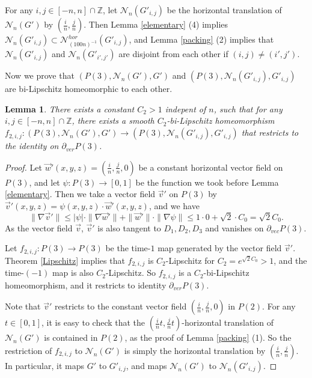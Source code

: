 \documentclass{amsart}
\newtheorem{lem}[thm]{Lemma}
\begin{document}
For any $i,j\in [-n,n]\cap \mathbb{Z}$, let $\mathcal{N}_n(G'_{i,j})$ be the horizontal translation of $\mathcal{N}_n(G')$ by $(\frac{i}{n},\frac{j}{n})$. Then Lemma \ref{elementary} (4) implies $\mathcal{N}_n(G'_{i,j})\subset \mathcal{N}^{hor}_{(100n)^{-1}}(G'_{i,j})$, and Lemma \ref{packing} (2) implies that $\mathcal{N}_n(G'_{i,j})$ and $\mathcal{N}_n(G'_{i',j'})$ are disjoint from each other if $(i,j)\ne (i',j')$.

Now we prove that $(P(3),\mathcal{N}_n(G'),G')$ and $(P(3),\mathcal{N}_n(G'_{i,j}),G'_{i,j})$ are bi-Lipschitz homeomorphic to each other.

\begin{lem}\label{translation}
There exists a constant $C_2>1$ indepent of $n$, such that for any $i,j\in [-n,n]\cap \mathbb{Z}$, there exists a smooth $C_2$-bi-Lipschitz homeomorphism $f_{2,i,j}:(P(3),\mathcal{N}_n(G'),G')\to (P(3),\mathcal{N}_n(G'_{i,j}),G'_{i,j})$ that restricts to the identity on $\partial_{ver}P(3)$.
\end{lem} 

\begin{proof}
Let $\vec{w}'(x,y,z)=(\frac{i}{n},\frac{j}{n}, 0)$ be a constant horizontal vector field on $P(3)$, and let $\psi:P(3)\to [0,1]$ be the function we took before Lemma \ref{elementary}. Then we take a vector field $\vec{v}'$ on $P(3)$ by $\vec{v}'(x,y,z)=\psi(x,y,z)\cdot \vec{w}'(x,y,z)$, and we have 
$$\|\nabla \vec{v}'\|\leq |\psi|\cdot \|\nabla \vec{w}'\|+\|\vec{w}'\|\cdot \|\nabla \psi\|\leq 1\cdot 0+\sqrt{2}\cdot C_0=\sqrt{2}C_0.$$
As the vector field $\vec{v}$, $\vec{v}'$ is also tangent to $D_1,D_2,D_3$ and vanishes on $\partial_{vec}P(3)$.

Let $f_{2,i,j}:P(3)\to P(3)$ be the time-$1$ map generated by the vector field $\vec{v}'$. Theorem \ref{Lipschitz} implies that $f_{2,i,j}$ is $C_2$-Lipschitz for $C_2=e^{\sqrt{2}C_0}>1$, and the time-$(-1)$ map is also $C_2$-Lipschitz. So $f_{2,i,j}$ is a $C_2$-bi-Lipschitz homeomorphism, and it restricts to identity $\partial_{ver}P(3)$.

Note that $\vec{v}'$ restricts to the constant vector field $(\frac{i}{n},\frac{j}{n}, 0)$ in $P(2)$. For any $t\in [0,1]$, it is easy to check that the $(\frac{i}{n}t,\frac{j}{n}t)$-horizontal translation of $\mathcal{N}_n(G')$ is contained in $P(2)$, as the proof of Lemma \ref{packing} (1). So the restriction of $f_{2,i,j}$ to $\mathcal{N}_n(G')$ is simply the horizontal translation by $(\frac{i}{n},\frac{j}{n})$. In particular, it maps $G'$ to $G'_{i,j}$, and maps $\mathcal{N}_n(G')$ to $\mathcal{N}_n(G'_{i,j})$.
\end{proof}
\end{document}
